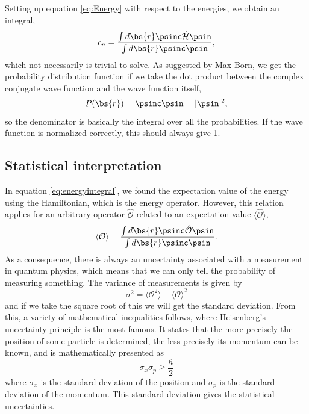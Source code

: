 Setting up equation \eqref{eq:Energy} with respect to the energies, we obtain an integral,
\begin{equation}
\epsilon_n=\frac{\int d\bs{r}\psinc\hat{\mathcal{H}}\psin}{\int d\bs{r}\psinc\psin},
\label{eq:energyintegral}
\end{equation}
which not necessarily is trivial to solve. As suggested by Max Born, we get the probability distribution function if we take the dot product between the complex conjugate wave function and the wave function itself,
\begin{equation}
P(\bs{r})=\psinc\psin=|\psin|^2,
\end{equation}
so the denominator is basically the integral over all the probabilities. If the wave function is normalized correctly, this should always give 1. 

\subsection{Statistical interpretation}
In equation \eqref{eq:energyintegral}, we found the expectation value of the energy using the Hamiltonian, which is the energy operator. However, this relation applies for an arbitrary operator $\mathcal{\hat{O}}$ related to an expectation value $\langle \mathcal{\hat{O}}\rangle$,
\begin{equation}
\langle \mathcal{O}\rangle=\frac{\int d\bs{r}\psinc\hat{\mathcal{O}}\psin}{\int d\bs{r}\psinc\psin}.
\label{eq:generalexp}
\end{equation}
As a consequence, there is always an uncertainty associated with a measurement in quantum physics, which means that we can only tell the probability of measuring something. The variance of measurements is given by
\begin{equation}
\sigma^2=\langle \mathcal{O}^2\rangle-\langle \mathcal{O}\rangle^2
\label{eq:variance}
\end{equation}
and if we take the square root of this we will get the standard deviation.
From this, a variety of mathematical inequalities follows, where Heisenberg's uncertainty principle is the most famous. It states that the more precisely the position of some particle is determined, the less precisely its momentum can be known, and is mathematically presented as
\begin{equation}
\sigma_x\sigma_p\geq\frac{\hbar}{2}
\end{equation}
where $\sigma_x$ is the standard deviation of the position and $\sigma_p$ is the standard deviation of the momentum. This standard deviation gives the statistical uncertainties. 

